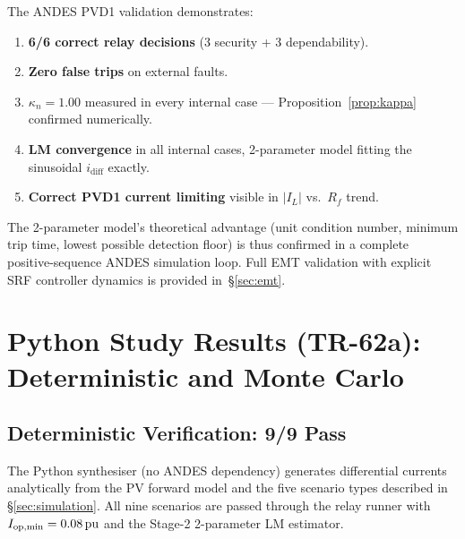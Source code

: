 \documentclass[11pt, a4paper]{article}
\newcommand{\pu}{\,\text{pu}}
\newcommand{\kn}{\kappa_n}
\begin{document}
The ANDES PVD1 validation demonstrates:
\begin{enumerate}
  \item \textbf{6/6 correct relay decisions} (3 security + 3 dependability).
  \item \textbf{Zero false trips} on external faults.
  \item \textbf{$\kn = 1.00$} measured in every internal case — Proposition~\ref{prop:kappa}
        confirmed numerically.
  \item \textbf{LM convergence} in all internal cases, 2-parameter model
        fitting the sinusoidal $i_\text{diff}$ exactly.
  \item \textbf{Correct PVD1 current limiting} visible in $|I_L|$ vs.~$R_f$ trend.
\end{enumerate}

The 2-parameter model's theoretical advantage (unit condition number, minimum
trip time, lowest possible detection floor) is thus confirmed in a complete
positive-sequence ANDES simulation loop.  Full EMT validation with explicit SRF
controller dynamics is provided in~\S\ref{sec:emt}.

\section{Python Study Results (TR-62a): Deterministic and Monte Carlo}
\label{sec:tr62a}

\subsection{Deterministic Verification: 9/9 Pass}

The Python synthesiser (no ANDES dependency) generates differential currents
analytically from the PV forward model and the five scenario types described in
\S\ref{sec:simulation}.  All nine scenarios are passed through the relay runner
with $I_{\rm op,min}=0.08\pu$ and the Stage-2 2-parameter LM estimator.
\end{document}
